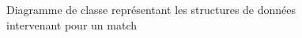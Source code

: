\documentclass[a4paper]{article}
\begin{document}
\newpage
\begin{figure}[H]
    \vspace*{-3cm}
   \caption{\label{3} Diagramme de classe représentant les structures de données intervenant pour un match}
\end{figure}
\newpage
\end{document}
